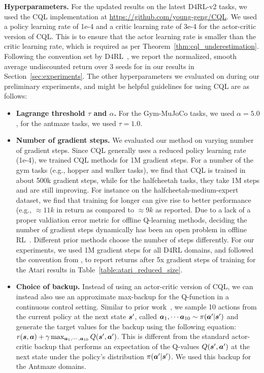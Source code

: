 \textbf{Hyperparameters.} For the updated results on the latest D4RL-v2 tasks, we used the CQL implementation at \url{https://github.com/young-geng/CQL}. We used a policy learning rate of 1e-4 and a critic learning rate of 3e-4 for the actor-critic version of CQL. This is to ensure that the actor learning rate is smaller than the critic learning rate, which is required as per Theorem~\ref{thm:cql_underestimation}. Following the convention set by D4RL~\citep{d4rl}, we report the normalized, smooth average undiscounted return over 3 seeds for in our results in Section~\ref{sec:experiments}.
The other hyperparameters we evaluated on during our preliminary experiments, and might be helpful guidelines for using CQL are as follows:
\begin{itemize}
    \item \textbf{Lagrange threshold $\tau$ and $\alpha$.} For the Gym-MuJoCo tasks, we used $\alpha=5.0$, for the antmaze tasks, we used $\tau=1.0$.
    \item \textbf{Number of gradient steps.} We evaluated our method on varying number of gradient steps. Since CQL generally uses a reduced policy learning rate (1e-4), we trained CQL methods for 1M gradient steps. For a number of the gym tasks (e.g., hopper and walker tasks), we find that CQL is trained in about 500k gradient steps, while for the halfcheetah tasks, they take 1M steps and are still improving. For instance on the halfcheetah-medium-expert dataset, we find that training for longer can give rise to better performance (e.g., $\approx 11k$ in return as compared to $\approx 9k$ as reported. Due to a lack of a proper valdiation error metric for offline Q-learning methods, deciding the number of gradient steps dynamically has been an open problem in offline RL~\citep{levine2020offline}. Different prior methods choose the number of steps differently. For our experiments, we used 1M gradient steps for all D4RL domains, and followed the convention from \citet{agarwal2019optimistic}, to report returns after 5x gradient steps of training for the Atari results in Table~\ref{table:atari_reduced_size}.  
    \item \textbf{Choice of backup.} Instead of using an actor-critic version of CQL, we can instead also use an approximate max-backup for the Q-function in a continuous control setting. Similar to prior work~\citep{kumar2019stabilizing}, we sample 10 actions from the current policy at the next state $\boldsymbol{s}'$, called $\boldsymbol{a}_1, \cdots \boldsymbol{a}_{10} \sim \pi(\boldsymbol{a}'|\boldsymbol{s}')$ and generate the target values for the backup using the following equation: $r(\boldsymbol{s}, \boldsymbol{a}) +  \gamma \max_{\boldsymbol{a}_1, \cdots, \boldsymbol{a}_{10}} Q(\boldsymbol{s}', \boldsymbol{a}')$. This is different from the standard actor-critic backup that performs an expectation of the Q-values $Q(\boldsymbol{s}', \boldsymbol{a}')$ at the next state under the policy's distribution $\pi(\boldsymbol{a}'|\boldsymbol{s}')$. We used this backup for the Antmaze domains.

\end{itemize}

